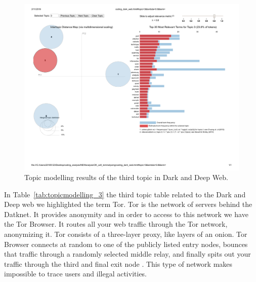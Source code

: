 \begin{figure}[h!]
\begin{center}
\includegraphics[scale=0.5]{./img/DARKDEEP_topic3.pdf}
\end{center}
\caption{Topic modelling results of the third topic in Dark and Deep Web.}
\label{fig:topicmodellingDARK_3}
\end{figure}


In Table~\ref{tab:topicmodelling_3} the third topic table related to the Dark and Deep web we highlighted the term Tor. Tor is the network of servers behind the Datknet. It provides anonymity and in order to access to this network we have the Tor Browser. It routes all your web traffic through the Tor network, anonymizing it. Tor consists of a three-layer proxy, like layers of an onion. Tor Browser connects at random to one of the publicly listed entry nodes, bounces that traffic through a randomly selected middle relay, and finally spits out your traffic through the third and final exit node \cite{tor}. This type of network makes impossible to trace users and illegal activities. 



